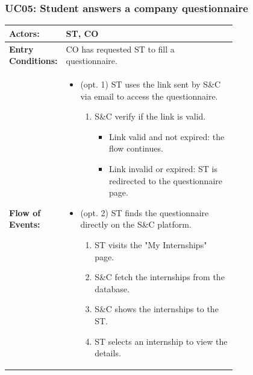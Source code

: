 \pagebreak


\subsubsection{UC05: Student answers a company questionnaire}
\label{subsubsec:student-answers-a-company-questionnaire}

\begin{center}
    \begin{longtable}{|l|p{0.75\linewidth}|}
        \hline
        \textbf{Actors:}           & ST, CO                                                                             \\
        \hline
        \textbf{Entry Conditions:} & CO has requested ST to fill a questionnaire.                                       \\
        \hline
        \textbf{Flow of Events:}   & \begin{itemize}
                                         \item (opt. 1) ST uses the link sent by S\&C via email to access the questionnaire.
                                               \begin{enumerate}
                      \item S\&C verify if the link is valid.
                            \begin{itemize}
                                \item Link valid and not expired: the flow continues.
                                \item Link invalid or expired: ST is redirected to the questionnaire page.
                            \end{itemize}
                  \end{enumerate}
                                         \item (opt. 2) ST finds the questionnaire directly on the S\&C platform.
                                               \begin{enumerate}
                      \item ST visits the "My Internships" page.
                      \item S\&C fetch the internships from the database.
                      \item S\&C shows the internships to the ST.
                      \item ST selects an internship to view the details.

\end{enumerate}
\end{itemize}
\end{longtable}
\end{center}

